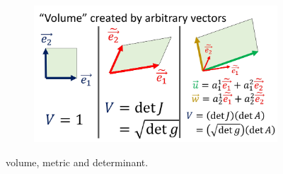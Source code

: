 \documentclass[12pt]{article} %
\begin{document}
\begin{enumerate}[label=\textbf{\arabic*})]
\begin{enumerate}[label=(\textbf{\alph*})]
\begin{figure}[H]
{\begin{subfigure}[b]{0.49\textwidth}
         \includegraphics[width=\textwidth]{Figs/v2.jpg}
     \end{subfigure}}
     \caption{\small volume, metric and determinant.} \label{fig:rjffsf}
\end{figure}    
    \begin{figure}[H]
     \centering
\end{figure}
\end{enumerate}
\end{enumerate}
\end{document}
